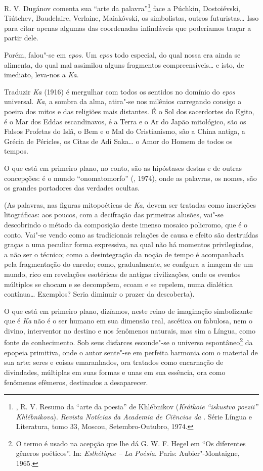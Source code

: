 R. V. Dugánov comenta sua ``arte da palavra''\footnote{,
R. V. Resumo da ``arte da poesia'' de Khlébnikov (\emph{Krátkoie ``iskustvo
poezii'' Khlébnikova}). \emph{Revista Notícias da Academia de Ciências da
}. Série Língua e Literatura, tomo 33, Moscou, Setembro-Outubro,
1974.} face a Púchkin, Dostoiévski, Tiútchev, Baudelaire, Verlaine,
Maiakóvski, os simbolistas, outros futuristas\ldots{} Isso para citar
apenas algumas das coordenadas infindáveis que poderíamos traçar a partir dele.

Porém, falou"-se em \emph{epos}. Um \emph{epos} todo especial, do qual
nossa era ainda se alimenta, do qual mal assimilou alguns fragmentos
compreensíveis\ldots{} e isto, de imediato, leva-nos a \emph{Ka}.

Traduzir \emph{Ka} (1916) é mergulhar com todos os sentidos no domínio
do \emph{epos} universal. \emph{Ka}, a sombra da alma, atira"-se nos
milênios carregando consigo a poeira dos mitos e das religiões mais
distantes. É o Sol dos sacerdortes do Egito, é o Mar dos Eddas
escandinavos, é a Terra e o Ar do Japão mitológico, são os Falsos
Profetas do Islã, o Bem e o Mal do Cristianismo, são a China antiga, a
Grécia de Péricles, os Citas de Adi Saka\ldots{} o Amor do Homem de todos os
tempos.

O que está em primeiro plano, no conto, são as hipóstases destas e de
outras concepções: é o mundo ``onomatomorfo'' (, 1974), onde as
palavras, os nomes, são os grandes portadores das verdades ocultas.

(As palavras, nas figuras mitopoéticas de \emph{Ka}, devem ser tratadas
como inscrições litográficas: aos poucos, com a decifração das primeiras
alusões, vai"-se descobrindo o método da composição deste imenso mosaico
policromo, que é o conto. Vai"-se vendo como as tradicionais relações de
causa e efeito são destruídas graças a uma peculiar forma expressiva, na
qual não há momentos privilegiados, a não ser o técnico; como a
desintegração da noção de tempo é acompanhada pela fragmentação do
enredo; como, gradualmente, se confgura a imagem de um mundo, rico em
revelações esotéricas de antigas civilizações, onde os eventos múltiplos
se chocam e se decompõem, ecoam e se repelem, numa dialética contínua\ldots{}
Exemplos? Seria diminuir o prazer da descoberta).

O que está em primeiro plano, dizíamos, neste reino de imaginação
simbolizante que é \emph{Ka} não é o ser humano em sua dimensão real,
ascética ou fabulosa, nem o divino, interventor no destino e nos
fenômenos naturais, mas sim a Língua, como fonte de conhecimento. Sob
seus disfarces esconde"-se o universo espontâneo\footnote{O termo é usado
  na acepção que lhe dá G. W. F. Hegel em ``Os diferentes gêneros
  poéticos''. In: \emph{Esthétique -- La Poésia}. Paris: Aubier"-Montaigne,
  1965.} da epopeia primitiva, onde o autor sente"-se em perfeita
harmonia com o material de sua arte: seres e coisas emaranhados, ora
tratados como encarnação de divindades, múltiplas em suas formas e unas
em sua essência, ora como fenômenos efêmeros, destinados a desaparecer.

